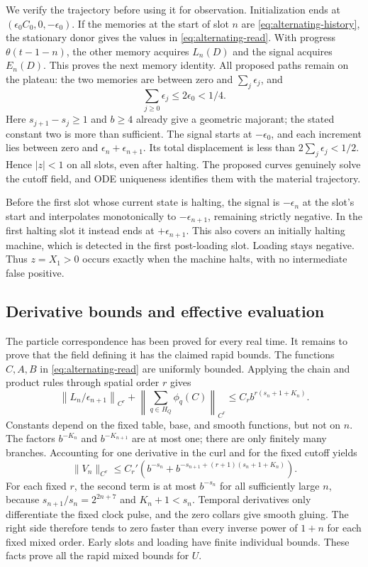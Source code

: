 We verify the trajectory before using it for observation.  Initialization
ends at $(\epsilon_0C_0,0,-\epsilon_0)$.  If the memories at the
start of slot $n$ are \eqref{eq:alternating-history}, the
stationary donor gives the values in \eqref{eq:alternating-read}.
With progress $\theta(t-1-n)$, the other memory acquires $L_n(D)$
and the signal acquires $E_n(D)$.  This proves the next memory identity.
All proposed paths remain on the plateau: the two memories are between
zero and $\sum_j\epsilon_j$, and
\[
 \sum_{j\geq0}\epsilon_j\leq2\epsilon_0<1/4.
\]
Here $s_{j+1}-s_j\geq1$ and $b\geq4$ already give a geometric
majorant; the stated constant two is more than sufficient.  The signal
starts at $-\epsilon_0$, and each increment lies between zero and
$\epsilon_n+\epsilon_{n+1}$.  Its total displacement is less than
$2\sum_j\epsilon_j<1/2$.  Hence $|z|<1$ on all slots, even after
halting.  The proposed curves genuinely solve the cutoff field, and
ODE uniqueness identifies them with the material trajectory.

Before the first slot whose current state is halting, the signal is
$-\epsilon_n$ at the slot's start and interpolates monotonically to
$-\epsilon_{n+1}$, remaining strictly negative.  In the first halting
slot it instead ends at $+\epsilon_{n+1}$.  This also covers an initially
halting machine, which is detected in the first post-loading slot.
Loading stays negative.  Thus $z=X_1>0$ occurs exactly when the machine
halts, with no intermediate false positive.

\subsection{Derivative bounds and effective evaluation}
The particle correspondence has been proved for every real time. It
remains to prove that the field defining it has the claimed rapid bounds.  The
functions $C,A,B$ in \eqref{eq:alternating-read} are uniformly
bounded.  Applying the chain and product rules through spatial order
$r$ gives
\[
 \left\|L_n/\epsilon_{n+1}\right\|_{C^r}
 +\left\|\sum_{q\in H_Q}\phi_q(C)\right\|_{C^r}
 \leq C_r b^{r(s_n+1+K_n)}.
\]
Constants depend on the fixed table, base, and smooth functions, but not
on $n$.  The factors $b^{-K_n}$ and $b^{-K_{n+1}}$ are at most one;
there are only finitely many branches.  Accounting for one derivative
in the curl and for the fixed cutoff yields
\begin{equation}
 \|V_n\|_{C^r}
 \leq C_r'\left(b^{-s_n}
      +b^{-s_{n+1}+(r+1)(s_n+1+K_n)}\right).
 \label{eq:alternating-estimate}
\end{equation}
For each fixed $r$, the second term is at most $b^{-s_n}$ for all
sufficiently large $n$, because $s_{n+1}/s_n=2^{2n+7}$ and
$K_n+1<s_n$.  Temporal derivatives only differentiate the fixed
clock pulse, and the zero collars give smooth gluing.  The right side
therefore tends to zero faster than every inverse power of $1+n$ for
each fixed mixed order.  Early slots and loading have finite individual
bounds.  These facts prove all the rapid mixed bounds for $U$.

